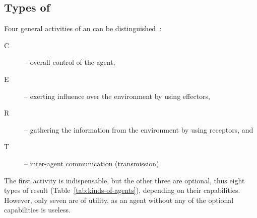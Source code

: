 \documentclass[11pt,oneside,a4paper]{article}
\begin{document}
		
	
	\subsection{Types of \Agents{}}\label{sec:agent_types}
	Four general activities of an \Agent{} can be distinguished~\cite{zielinski-kka:2017}:
	\begin{description}
		\item[C] -- overall control of the agent,
		\item[E] -- exerting influence over the environment by using effectors,
		\item[R] -- gathering the information from the environment by using receptors, and
		\item[T] -- inter-agent communication (transmission).
	\end{description}
	
	The first activity is indispensable, but the other three are optional, thus eight types of \Agents{} result (Table~\ref{tab:kinds-of-agents}), depending on their capabilities.
	However, only seven are of utility, as an agent without any of the optional capabilities is useless.
	
	\begin{table}[H]
		\centering
		\caption{Type of \Agent{}, number of its \Subsystems{} ($|\protect\eve{}|$, $|\protect\ere{}|$, $|\protect\evr{}|$, $|\protect\err{}|$) and number of inter agent communication \Links{} ($|\protect\eaa{}|$)
			expressed with respect to the number of \Buffers{} of the considered \Agent{}}
		\label{tab:kinds-of-agents}
	\end{table}	
	
\end{document}
